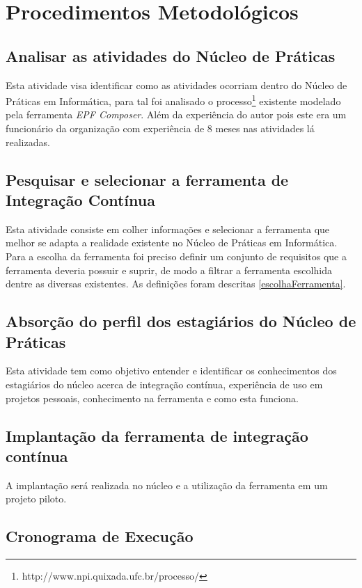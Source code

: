 \chapter{Procedimentos Metodológicos}\label{metodologia}

\section{Analisar as atividades do Núcleo de Práticas}
Esta atividade visa identificar como as atividades ocorriam dentro do Núcleo de Práticas em Informática, para tal foi analisado o processo\footnote{http://www.npi.quixada.ufc.br/processo/} existente modelado pela ferramenta \textit{EPF Composer}. Além da experiência do autor pois este era um funcionário da organização com experiência de 8 meses nas atividades lá realizadas. 

\section{Pesquisar e selecionar a ferramenta de Integração Contínua}

Esta atividade consiste em  colher informações e selecionar a ferramenta que melhor se adapta a realidade existente no Núcleo de Práticas em Informática. 
Para a escolha da ferramenta foi preciso definir um conjunto de requisitos que a ferramenta deveria possuir e suprir, de modo a filtrar a ferramenta escolhida dentre as diversas existentes. As definições foram descritas \autoref{escolhaFerramenta}. 

\section{Absorção do perfil dos estagiários do Núcleo de Práticas}
Esta atividade tem como objetivo entender e identificar os conhecimentos dos estagiários do núcleo acerca de integração contínua, experiência de uso em projetos pessoais, conhecimento na ferramenta e como esta funciona.

\section{Implantação da ferramenta de integração contínua}
A implantação será realizada no núcleo e a utilização da ferramenta em um projeto piloto.


\pagebreak
\section{Cronograma de Execução}

